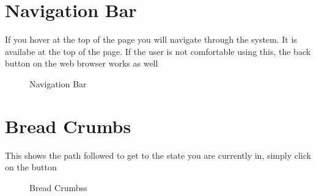 \documentclass[12pt]{article}
\begin{document}
 \newpage

\section{Navigation Bar}
If you hover at the top of the page you will navigate through the system. It is availabe at the top of the page. If the user is not comfortable using this, the back button on the web browser works as well
\begin{figure}[H]
\centering	
{}
\caption{Navigation Bar}
\end{figure}

 \newpage

\section{Bread Crumbs}
This shows the path followed to get to the state you are currently in, simply click on the button
\begin{figure}[H]
\centering	
{}
\caption{Bread Crumbss}
\end{figure}
\end{document}
